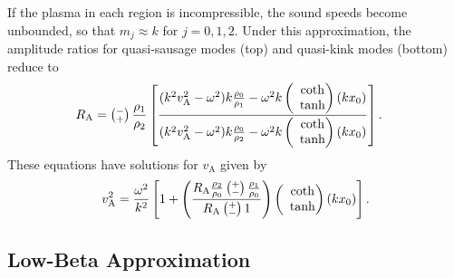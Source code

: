 \documentclass[namedreferences]{solarphysics}
\numberwithin{equation}{section}
\begin{document}
\begin{article}
If the plasma in each region is incompressible, the sound speeds become unbounded, so that $m_j \approx k$ for $j = 0,1,2$. Under this approximation, the amplitude ratios for quasi-sausage modes (top) and quasi-kink modes (bottom) reduce to
\begin{align}
R_\textrm{A} &= \left(\substack{- \\ +}\right) \frac{\rho_1}{\rho_2} \left[ \frac{(k^2v_\textrm{A}^2-\omega^2)k\frac{\rho_0}{\rho_1}-\omega^2k \left(\hspace{-0.07in}\begin{matrix} &\coth \\ &\tanh \end{matrix}\right)(kx_0)}{(k^2v_\textrm{A}^2-\omega^2)k\frac{\rho_0}{\rho_2}-\omega^2k \left(\hspace{-0.07in}\begin{matrix} &\coth \\ &\tanh \end{matrix}\right)(kx_0)} \right].
\end{align}
These equations have solutions for $v_\textrm{A}$ given by
\begin{equation}
v_\textrm{A}^2 = \frac{\omega^2}{k^2} \left[ 1 + \left( \frac{R_\textrm{A} \frac{\rho_2}{\rho_0} \left(\substack{+ \\ -}\right) \frac{\rho_1}{\rho_0}}{R_\textrm{A} \left(\substack{+ \\ -}\right) 1} \right) \left(\hspace{-0.07in}\begin{matrix} &\coth \\ &\tanh \end{matrix}\right) (kx_0)\right].
\end{equation}

\subsection{Low-Beta Approximation} \label{sec: AR low-beta}


\end{article}
\end{document}
